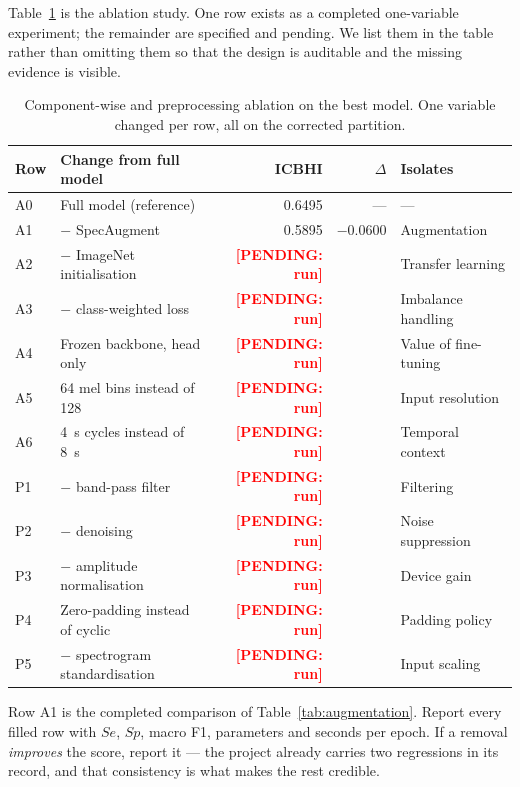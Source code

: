 \documentclass[journal,onecolumn]{IEEEtran}
\newcommand{\pending}[1]{\textcolor{red}{\textbf{[PENDING: #1]}}}
\begin{document}
Table~\ref{tab:ablation} is the ablation study. One row exists as a completed
one-variable experiment; the remainder are specified and pending. We list them
in the table rather than omitting them so that the design is auditable and the
missing evidence is visible.

\begin{table}[!t]
\centering
\caption{Component-wise and preprocessing ablation on the best model. One variable
changed per row, all on the corrected partition.}
\label{tab:ablation}
\begin{tabular}{llrrl}
\toprule
Row & Change from full model & ICBHI & $\Delta$ & Isolates \\
\midrule
A0 & Full model (reference)          & 0.6495 & ---      & --- \\
A1 & $-$ SpecAugment                 & 0.5895 & $-0.0600$ & Augmentation \\
A2 & $-$ ImageNet initialisation     & \pending{run} & & Transfer learning \\
A3 & $-$ class-weighted loss         & \pending{run} & & Imbalance handling \\
A4 & Frozen backbone, head only      & \pending{run} & & Value of fine-tuning \\
A5 & 64 mel bins instead of 128      & \pending{run} & & Input resolution \\
A6 & 4~s cycles instead of 8~s       & \pending{run} & & Temporal context \\
\midrule
P1 & $-$ band-pass filter            & \pending{run} & & Filtering \\
P2 & $-$ denoising                   & \pending{run} & & Noise suppression \\
P3 & $-$ amplitude normalisation     & \pending{run} & & Device gain \\
P4 & Zero-padding instead of cyclic  & \pending{run} & & Padding policy \\
P5 & $-$ spectrogram standardisation & \pending{run} & & Input scaling \\
\bottomrule
\end{tabular}

\vspace{2pt}
\footnotesize Row A1 is the completed comparison of Table~\ref{tab:augmentation}.
Report every filled row with $Se$, $Sp$, macro F1, parameters and seconds per epoch.
If a removal \emph{improves} the score, report it --- the project already carries two
regressions in its record, and that consistency is what makes the rest credible.
\end{table}
\end{document}

